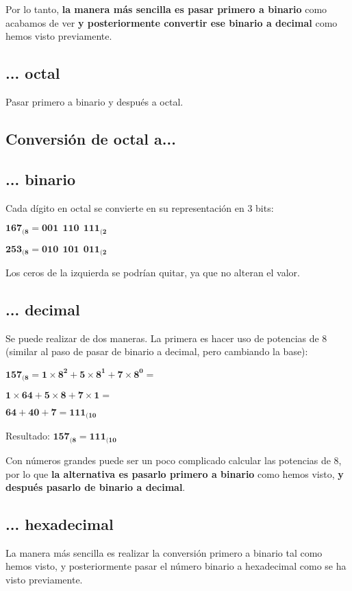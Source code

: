 Por lo tanto, \textbf{la manera más sencilla es pasar primero a binario} como acabamos de ver \textbf{y posteriormente convertir ese binario a decimal} como hemos visto previamente.

\subsection*{... octal}
Pasar primero a binario y después a octal.



\subsection{Conversión de octal a...}
\subsection*{... binario}
Cada dígito en octal se convierte en su representación en 3 bits:

\begin{center}
    \vspace{-15pt}
    $\mathbf{167_{(8} = 001\ \ 110\ \ 111_{(2}}$

    $\mathbf{253_{(8} = 010\ \ 101\ \ 011_{(2}}$
    \vspace{-15pt}
\end{center}
Los ceros de la izquierda se podrían quitar, ya que no alteran el valor.

\subsection*{... decimal}
Se puede realizar de dos maneras. La primera es hacer uso de potencias de 8 (similar al paso de pasar de binario a decimal, pero cambiando la base):

\begin{center}
    \vspace{-15pt}
    $\mathbf{157_{(8} = 1\times8^2 + 5\times8^1 + 7\times8^0 = }$

    $\mathbf{1\times64 + 5\times8 + 7\times1 = }$

    $\mathbf{64 + 40 + 7 = 111_{(10}}$

    Resultado: $\mathbf{157_{(8} = 111_{(10}}$
    \vspace{-15pt}
\end{center}

Con números grandes puede ser un poco complicado calcular las potencias de 8, por lo que \textbf{la alternativa es pasarlo primero a binario} como hemos visto, \textbf{y después pasarlo de binario a decimal}.

\subsection*{... hexadecimal}
La manera más sencilla es realizar la conversión primero a binario tal como hemos visto, y posteriormente pasar el número binario a hexadecimal como se ha visto previamente.